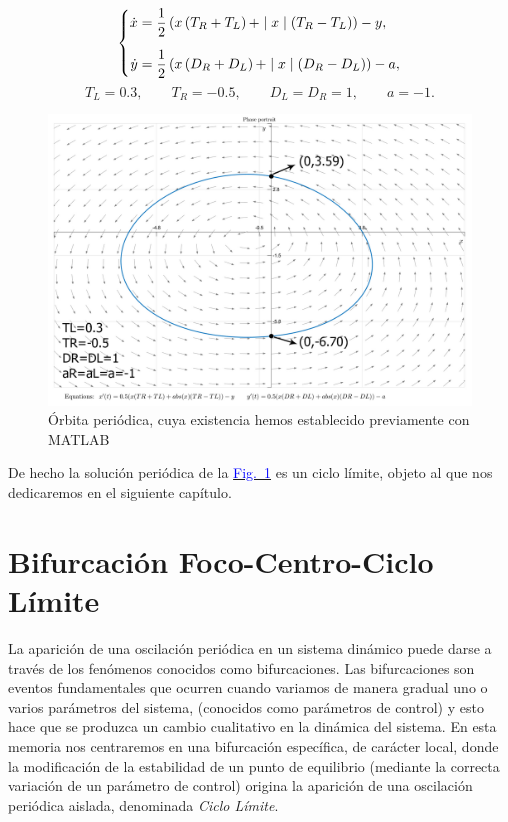 \documentclass[12pt,a4paper]{report} %
\newcommand{\fref}[1]{\hyperref[#1]{\textcolor{blue}{Fig.~\ref*{#1}}}}
\newcommand{\fref}[1]{\hyperref[#1]{\textcolor{blue}{\textit{Fig.~\ref*{#1}}}}}
\begin{document}
	\begin{equation}
		\label{eq:clejem}
		\scalebox{1}{$\displaystyle
			\left\{
			\begin{aligned}
			\dot{x}&=\frac{1}{2}\left( x\left(T_R+T_L\right)+\mid x\mid \left(T_R-T_L\right)\right)-y,
				 \\[2mm]
			\dot{y}&=\frac{1}{2}\left( x\left(D_R+D_L\right)+\mid x\mid \left(D_R-D_L\right)\right)-a,
			\end{aligned}
			\right. 
			$}
	\end{equation}\smallskip
	\begin{equation*}
		T_L=0.3, \qquad T_R=-0.5, \qquad D_L=D_R=1, \qquad a=-1.
	\end{equation*}\smallskip
	
	\begin{figure}[h]
		\centering
		\includegraphics[width=1\textwidth]{clejemplo.jpg}
		\caption{Órbita periódica, cuya existencia hemos establecido previamente con MATLAB}
		\label{fig:clejemplo}
	\end{figure}\smallskip
	
	\vspace{0.5cm} De hecho la solución periódica de la \fref{fig:clejemplo} es un ciclo límite, objeto al que nos dedicaremos en el siguiente capítulo.
	
	\newpage
	
	\chapter{Bifurcación Foco-Centro-Ciclo Límite}
	\label{cap.5}

	La aparición de una oscilación periódica en un sistema dinámico puede darse a través de los fenómenos conocidos como bifurcaciones. Las bifurcaciones son eventos fundamentales que ocurren cuando variamos de manera gradual uno o varios parámetros del sistema, (conocidos como parámetros de control) y esto hace que se produzca un cambio cualitativo en la dinámica del sistema. En esta memoria nos centraremos en una bifurcación específica, de carácter local, donde la modificación de la estabilidad de un punto de equilibrio (mediante la correcta variación de un parámetro de control) origina la aparición de una oscilación periódica aislada, denominada \textit{Ciclo Límite}.
\end{document}
